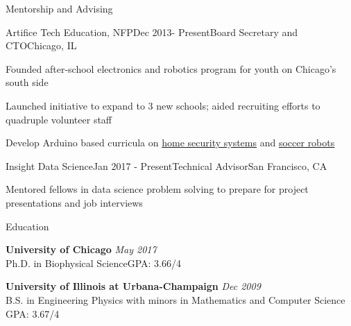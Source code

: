 \documentclass{resume} %
\begin{document}

\begin{rSection}{Mentorship and Advising}

\begin{rSubsection}{Artifice Tech Education, NFP}{Dec 2013- Present}{Board Secretary and CTO}{Chicago, IL}
	\item Founded after-school electronics and robotics program for youth on Chicago's south side
	\item Launched initiative to expand to 3 new schools; aided recruiting efforts to quadruple volunteer staff
	\item Develop Arduino based curricula on \href{http://www.makeloft.org/2014/12/raser-curriculum.html}{home security systems} and \href{http://blog.artificechicago.org/2016/05/bluetooth-redbot-tutorial.html}{soccer robots}

\end{rSubsection}


\begin{rSubsection}{Insight Data Science}{Jan 2017 - Present}{Technical Advisor}{San Francisco, CA}
	\item Mentored fellows in data science problem solving to prepare for project presentations and job interviews
	
\end{rSubsection}




\end{rSection}





\begin{rSection}{Education}

{\bf University of Chicago} \hfill {\em May 2017} \\ 
Ph.D. in Biophysical Science\hfill {GPA: 3.66/4} 

{\bf University of Illinois at Urbana-Champaign} \hfill {\em Dec 2009} \\ 
B.S. in Engineering Physics with minors in Mathematics and Computer Science \hfill {GPA: 3.67/4} 

\end{rSection}

\end{document}
